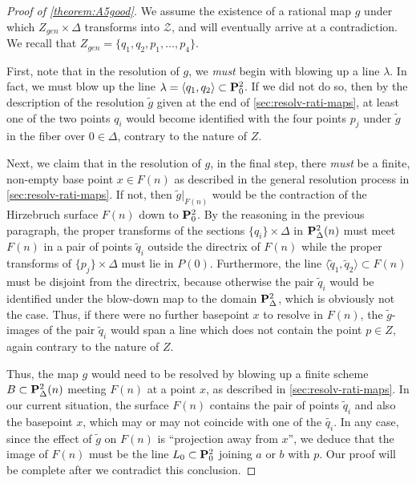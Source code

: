 \documentclass[12pt,reqno]{amsart}
\numberwithin{equation}{section}
\newcommand{\td}{\widetilde}
\begin{document}
\begin{proof}[Proof of \autoref{theorem:A5good}]
  We assume the existence of a rational map $g$ under which
  $Z_{gen} \times \Delta$ transforms into $\mathcal{Z}$, and will
  eventually arrive at a contradiction.  We recall that
  $Z_{gen} = \{q_1, q_2, p_1, \dots, p_4\}$.

  First, note that in the resolution of $g$, we {\sl must} begin with
  blowing up a line $\lambda$. In fact, we must blow up the line
  $\lambda = \langle q_{1}, q_{2} \rangle \subset \P^{2}_{0}$.  If we
  did not do so, then by the description of the resolution $\td{g}$
  given at the end of \autoref{sec:resolv-rati-maps}, at least one of
  the two points $q_{i}$ would become identified with the four points
  $p_{j}$ under $\td{g}$ in the fiber over $0 \in \Delta$, contrary to
  the nature of $Z$.

  Next, we claim that in the resolution of $g$, in the final step,
  there {\sl must} be a finite, non-empty base point $x \in F(n)$ as
  described in the general resolution process in
  \autoref{sec:resolv-rati-maps}.  If not, then $\td{g}\big|_{F(n)}$
  would be the contraction of the Hirzebruch surface $F(n)$ down to
  $\P^{2}_{0}$.  By the reasoning in the previous paragraph, the
  proper transforms of the sections $\{q_{i}\} \times \Delta$ in
  $\P^{2}_{\Delta}(n)$ must meet $F(n)$ in a pair of points
  $\td{q}_{i}$ outside the directrix of $F(n)$ while the proper
  transforms of $\{p_{j}\} \times \Delta$ must lie in
  $P(0)$. Furthermore, the line
  $\langle \td{q}_{1}, \td{q}_{2} \rangle \subset F(n)$ must be
  disjoint from the directrix, because otherwise the pair $\td{q}_{i}$
  would be identified under the blow-down map to the domain
  $\P^{2}_{\Delta}$, which is obviously not the case.  Thus, if there
  were no further basepoint $x$ to resolve in $F(n)$, the
  $\td{g}$-images of the pair $\td{q}_{i}$ would span a line which
  does not contain the point $p \in Z$, again contrary to the nature
  of $Z$.

  Thus, the map $g$ would need to be resolved by blowing up a finite
  scheme $B \subset \P^{2}_{\Delta}(n)$ meeting $F(n)$ at a point $x$,
  as described in \autoref{sec:resolv-rati-maps}. In our current
  situation, the surface $F(n)$ contains the pair of points
  $\td{q}_{i}$ and also the basepoint $x$, which may or may not
  coincide with one of the $\td{q_{i}}$.  In any case, since the
  effect of $\td{g}$ on $F(n)$ is ``projection away from $x$'', we
  deduce that the image of $F(n)$ must be the line
  $L_0 \subset \P^{2}_{0}$ joining $a$ or $b$ with $p$.  Our proof
  will be complete after we contradict this conclusion.


\end{proof}
\end{document}
